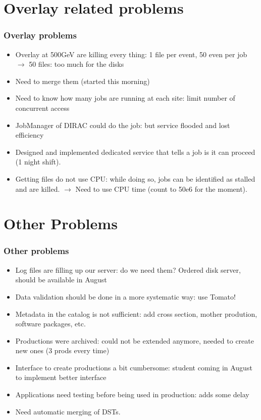 \documentclass{beamer}
\begin{document}
\section{Overlay related problems}
\begin{frame}
\frametitle{Overlay problems}
\begin{itemize}
  \item Overlay at 500GeV are killing every thing: 1 file per event, 50 even per
  job $\to$ 50 files: too much for the disks
  \item Need to \alert{merge} them (started this morning)
  \item Need to know how many jobs are running at each site: limit number of
  concurrent access
  \item JobManager of DIRAC could do the job: but service flooded and lost
  efficiency
  \item Designed and implemented dedicated service that tells a job is it can
  proceed (1 night shift).
  \item Getting files do not use CPU: while doing so, jobs can be identified as
  stalled and are killed. $\to$ Need to use CPU time (count to 50e6 for the
  moment).
\end{itemize}
\end{frame}
\section{Other Problems}
\begin{frame}
\frametitle{Other problems}
\begin{itemize}
  \item Log files are filling up our server: do we need them? Ordered disk
  server, should be available in August
  \item \alert{Data validation} should be done in a more systematic way: use
  Tomato!
  \item Metadata in the catalog is not sufficient: add cross section, mother
  prodution, software packages, etc.
  \item Productions were archived: could not be extended anymore, needed to
  create new ones (3 prods every time)
  \item Interface to create productions a bit cumbersome: student coming in
  August to implement better interface
  \item Applications need testing before being used in production: adds some
  delay
  \item Need automatic merging of DSTs.
\end{itemize}
\end{frame}
\end{document}
